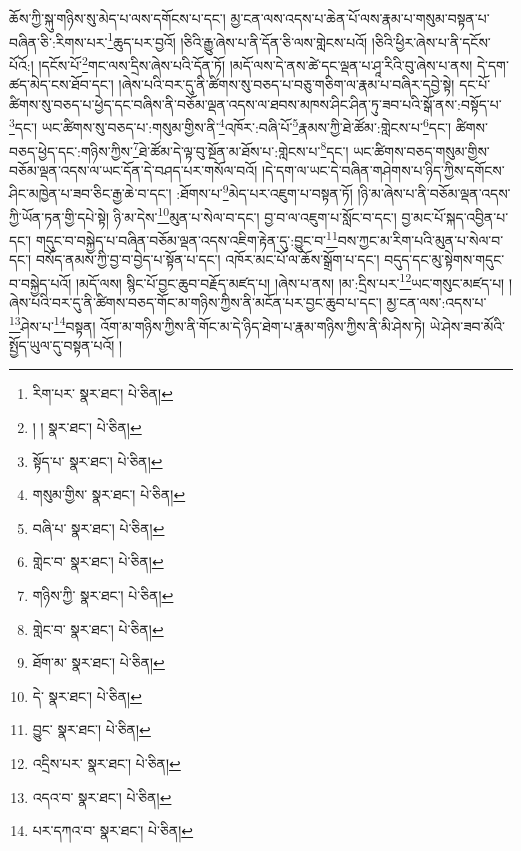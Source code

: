 ཆོས་ཀྱི་སྐུ་གཉིས་སུ་མེད་པ་ལས་དགོངས་པ་དང་། མྱ་ངན་ལས་འདས་པ་ཆེན་པོ་ལས་རྣམ་པ་གསུམ་བསྟན་པ་བཞིན་ཅི་:རིགས་པར་\footnote{རིག་པར་  སྣར་ཐང་།  པེ་ཅིན། }ཆུད་པར་བྱའོ། །ཅིའི་རྒྱུ་ཞེས་པ་ནི་དོན་ཅི་ལས་གླེངས་པའོ། །ཅིའི་ཕྱིར་ཞེས་པ་ནི་དངོས་པོའོ:། །དངོས་པོ་\footnote{། །  སྣར་ཐང་།  པེ་ཅིན། }གང་ལས་དྲིས་ཞེས་པའི་དོན་ཏོ། །མདོ་ལས་དེ་ནས་ཚེ་དང་ལྡན་པ་ཤཱ་རིའི་བུ་ཞེས་པ་ནས། དེ་དག་ཚད་མེད་ངས་ཐོབ་དང་། །ཞེས་པའི་བར་དུ་ནི་ཚིགས་སུ་བཅད་པ་བཅུ་གཅིག་ལ་རྣམ་པ་བཞིར་དབྱེ་སྟེ། དང་པོ་ཚིགས་སུ་བཅད་པ་ཕྱེད་དང་བཞིས་ནི་བཅོམ་ལྡན་འདས་ལ་ཐབས་མཁས་ཤིང་ཤིན་ཏུ་ཟབ་པའི་སྒོ་ནས་:བསྟོད་པ་\footnote{སྟོད་པ་  སྣར་ཐང་།  པེ་ཅིན། }དང་། ཡང་ཚིགས་སུ་བཅད་པ་:གསུམ་གྱིས་ནི་\footnote{གསུམ་གྱིས་  སྣར་ཐང་།  པེ་ཅིན། }འཁོར་:བཞི་པོ་\footnote{བཞི་པ་  སྣར་ཐང་།  པེ་ཅིན། }རྣམས་ཀྱི་ཐེ་ཚོམ་:གླེངས་པ་\footnote{གླེང་བ་  སྣར་ཐང་།  པེ་ཅིན། }དང་། ཚིགས་བཅད་ཕྱེད་དང་:གཉིས་ཀྱིས་\footnote{གཉིས་ཀྱི་  སྣར་ཐང་།  པེ་ཅིན། }ཐེ་ཚོམ་དེ་ལྟ་བུ་སྔོན་མ་ཐོས་པ་:གླེངས་པ་\footnote{གླེང་བ་  སྣར་ཐང་།  པེ་ཅིན། }དང་། ཡང་ཚིགས་བཅད་གསུམ་གྱིས་བཅོམ་ལྡན་འདས་ལ་ཡང་དོན་དེ་བཤད་པར་གསོལ་བའོ། །དེ་དག་ལ་ཡང་དེ་བཞིན་གཤེགས་པ་ཉིད་ཀྱིས་དགོངས་ཤིང་མཁྱེན་པ་ཟབ་ཅིང་རྒྱ་ཆེ་བ་དང་། :ཐོགས་པ་\footnote{ཐོག་མ་  སྣར་ཐང་།  པེ་ཅིན། }མེད་པར་འཇུག་པ་བསྟན་ཏོ། །ཉི་མ་ཞེས་པ་ནི་བཅོམ་ལྡན་འདས་ཀྱི་ཡོན་ཏན་གྱི་དཔེ་སྟེ། ཉི་མ་དེས་\footnote{དེ་  སྣར་ཐང་།  པེ་ཅིན། }མུན་པ་སེལ་བ་དང་། བྱ་བ་ལ་འཇུག་པ་སློང་བ་དང་། བྱ་མང་པོ་སྐད་འབྱིན་པ་དང་། གདུང་བ་བསྐྱེད་པ་བཞིན་བཅོམ་ལྡན་འདས་འཇིག་རྟེན་དུ་:བྱུང་བ་\footnote{བྱུང་  སྣར་ཐང་།  པེ་ཅིན། }བས་ཀྱང་མ་རིག་པའི་མུན་པ་སེལ་བ་དང་། བསོད་ནམས་ཀྱི་བྱ་བ་བྱེད་པ་སྟོན་པ་དང་། འཁོར་མང་པོ་ལ་ཆོས་སྒྲོག་པ་དང་། བདུད་དང་མུ་སྟེགས་གདུང་བ་བསྐྱེད་པའོ། །མདོ་ལས། སྙིང་པོ་བྱང་ཆུབ་བརྗོད་མཛད་པ། །ཞེས་པ་ནས། །མ་:དྲིས་པར་\footnote{འདྲིས་པར་  སྣར་ཐང་།  པེ་ཅིན། }ཡང་གསུང་མཛད་པ། །ཞེས་པའི་བར་དུ་ནི་ཚིགས་བཅད་གོང་མ་གཉིས་ཀྱིས་ནི་མངོན་པར་བྱང་ཆུབ་པ་དང་། མྱ་ངན་ལས་:འདས་པ་\footnote{འདའ་བ་  སྣར་ཐང་།  པེ་ཅིན། }ཤེས་པ་\footnote{པར་དཀའ་བ་  སྣར་ཐང་།  པེ་ཅིན། }བསྟན། འོག་མ་གཉིས་ཀྱིས་ནི་གོང་མ་དེ་ཉིད་ཐེག་པ་རྣམ་གཉིས་ཀྱིས་ནི་མི་ཤེས་ཏེ། ཡེ་ཤེས་ཟབ་མོའི་སྤྱོད་ཡུལ་དུ་བསྟན་པའོ། །
